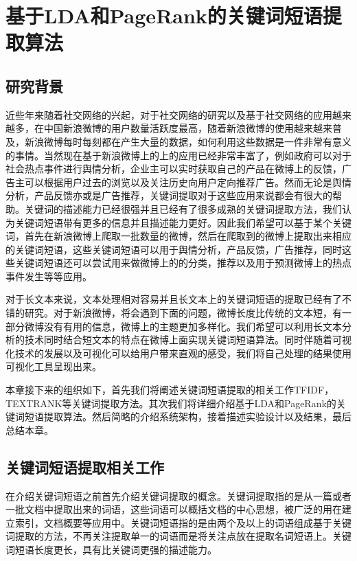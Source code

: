 \documentclass[master]{njuthesis}
\begin{document}
\chapter{基于LDA和PageRank的关键词短语提取算法}\label{chapter_smallworld}
\section{研究背景}

    近些年来随着社交网络的兴起，对于社交网络的研究以及基于社交网络的应用越来越多，在中国新浪微博的用户数量活跃度最高，随着新浪微博的使用越来越来普及，新浪微博每时每刻都在产生大量的数据，如何利用这些数据是一件非常有意义的事情。当然现在基于新浪微博上的上的应用已经非常丰富了，例如政府可以对于社会热点事件进行舆情分析，企业主可以实时获取自己的产品在微博上的反馈，广告主可以根据用户过去的浏览以及关注历史向用户定向推荐广告。然而无论是舆情分析，产品反馈亦或是广告推荐，关键词提取对于这些应用来说都会有很大的帮助。关键词的描述能力已经很强并且已经有了很多成熟的关键词提取方法，我们认为关键词短语带有更多的信息并且描述能力更好。因此我们希望可以基于某个关键词，首先在新浪微博上爬取一批数量的微博，然后在爬取到的微博上提取出来相应的关键词短语，这些关键词短语可以用于舆情分析，产品反馈，广告推荐，同时这些关键词短语还可以尝试用来做微博上的的分类，推荐以及用于预测微博上的热点事件发生等等应用。

    对于长文本来说，文本处理相对容易并且长文本上的关键词短语的提取已经有了不错的研究。对于新浪微博，将会遇到下面的问题，微博长度比传统的文本短，有一部分微博没有有用的信息，微博上的主题更加多样化。我们希望可以利用长文本分析的技术同时结合短文本的特点在微博上面实现关键词短语算法。同时伴随着可视化技术的发展以及可视化可以给用户带来直观的感受，我们将自己处理的结果使用可视化工具呈现出来。

    本章接下来的组织如下，首先我们将阐述关键词短语提取的相关工作TFIDF，TEXTRANK等关键词提取方法。其次我们将详细介绍基于LDA和PageRank的关键词短语提取算法。然后简略的介绍系统架构，接着描述实验设计以及结果，最后总结本章。

\section{关键词短语提取相关工作}

    在介绍关键词短语之前首先介绍关键词提取的概念。关键词提取指的是从一篇或者一批文档中提取出来的词语，这些词语可以概括文档的中心思想，被广泛的用在建立索引，文档概要等应用中。关键词短语指的是由两个及以上的词语组成基于关键词提取的方法，不再关注提取单一的词语而是将关注点放在提取名词短语上。关键词短语长度更长，具有比关键词更强的描述能力。
\end{document}
